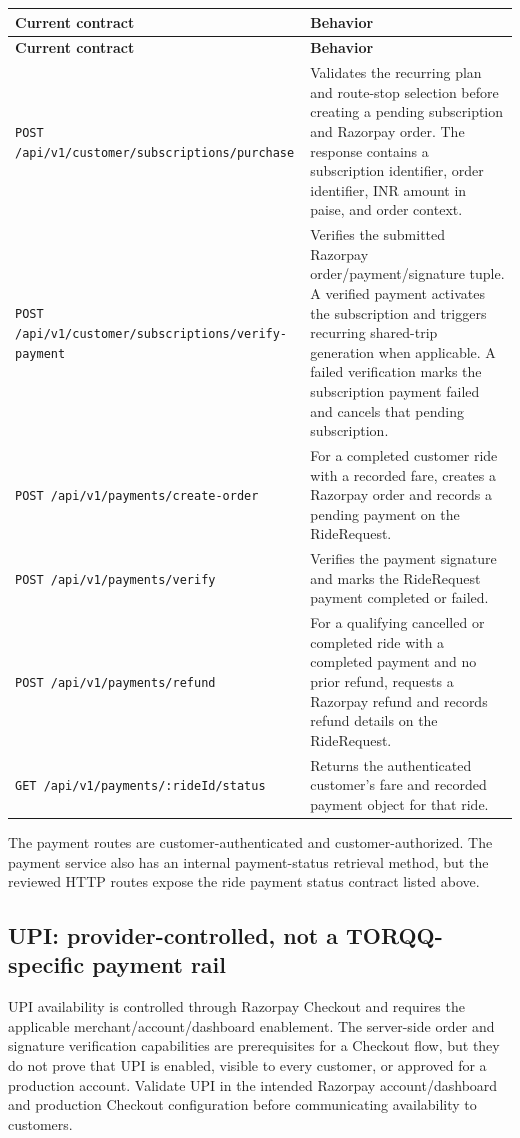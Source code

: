 \documentclass[11pt,a4paper]{article}
\newcommand{\code}[1]{\texttt{#1}}
\begin{document}
\begin{longtable}{p{} Z}
\toprule
\textbf{Current contract} & \textbf{Behavior} \\
\midrule
\endfirsthead
\toprule
\textbf{Current contract} & \textbf{Behavior} \\
\midrule
\endhead
\code{POST /api/v1/customer/subscriptions/purchase} & Validates the recurring plan and route-stop selection before creating a pending subscription and Razorpay order. The response contains a subscription identifier, order identifier, INR amount in paise, and order context. \\
\code{POST /api/v1/customer/subscriptions/verify-payment} & Verifies the submitted Razorpay order/payment/signature tuple. A verified payment activates the subscription and triggers recurring shared-trip generation when applicable. A failed verification marks the subscription payment failed and cancels that pending subscription. \\
\code{POST /api/v1/payments/create-order} & For a completed customer ride with a recorded fare, creates a Razorpay order and records a pending payment on the RideRequest. \\
\code{POST /api/v1/payments/verify} & Verifies the payment signature and marks the RideRequest payment completed or failed. \\
\code{POST /api/v1/payments/refund} & For a qualifying cancelled or completed ride with a completed payment and no prior refund, requests a Razorpay refund and records refund details on the RideRequest. \\
\code{GET /api/v1/payments/:rideId/status} & Returns the authenticated customer's fare and recorded payment object for that ride. \\
\bottomrule
\end{longtable}

The payment routes are customer-authenticated and customer-authorized. The payment service also has an internal payment-status retrieval method, but the reviewed HTTP routes expose the ride payment status contract listed above.

\subsection{UPI: provider-controlled, not a TORQQ-specific payment rail}
UPI availability is controlled through Razorpay Checkout and requires the applicable merchant/account/dashboard enablement. The server-side order and signature verification capabilities are prerequisites for a Checkout flow, but they do not prove that UPI is enabled, visible to every customer, or approved for a production account. Validate UPI in the intended Razorpay account/dashboard and production Checkout configuration before communicating availability to customers.
\end{document}
